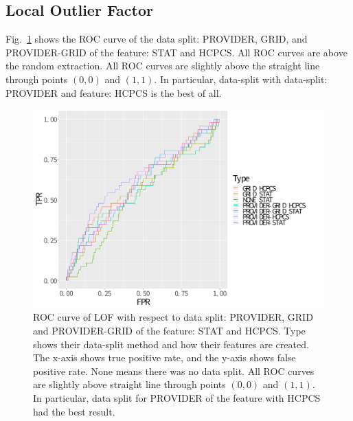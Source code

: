 \documentclass[dvipdfmx, english]{ampmt}             %
\newcommand{\Figref}[1]{Fig.~\ref{#1}}
\begin{document}
\subsection{Local Outlier Factor}

\Figref{fig:roc-lof} shows the ROC curve of the data split: PROVIDER, GRID, and PROVIDER-GRID of the feature: STAT and HCPCS. All ROC curves are above the random extraction. 
All ROC curves are slightly above the straight line through points $(0,0)$ and $(1,1)$. In particular, data-split with data-split: PROVIDER and feature: HCPCS is the best of all.

\begin{figure}[H]
\centerline{\includegraphics[scale=0.5]{../img/lof-roc.pdf}}
\caption{ROC curve of LOF with respect to data split: PROVIDER, GRID and PROVIDER-GRID of the feature: STAT and HCPCS. Type shows their data-split method and how their features are created.
The x-axis shows true positive rate, and the y-axis shows false positive rate. None means there was no data split. All ROC curves are slightly above straight line through points $(0,0)$ and $(1,1)$. In particular, data split for PROVIDER of the feature with HCPCS had the best result.}
\label{fig:roc-lof}
\end{figure}


\end{document}
